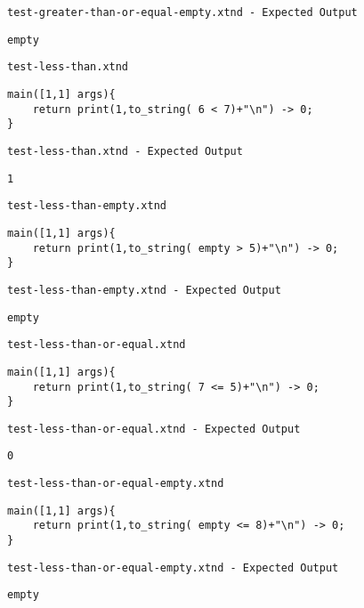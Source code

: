 \medskip \noindent \texttt{test-greater-than-or-equal-empty.xtnd - Expected Output}


\begin{lstlisting}
empty
\end{lstlisting}


\medskip \noindent \texttt{test-less-than.xtnd}


\begin{lstlisting}
main([1,1] args){
	return print(1,to_string( 6 < 7)+"\n") -> 0;
}
\end{lstlisting}


\medskip \noindent \texttt{test-less-than.xtnd - Expected Output}


\begin{lstlisting}
1
\end{lstlisting}


\medskip \noindent \texttt{test-less-than-empty.xtnd}


\begin{lstlisting}
main([1,1] args){
	return print(1,to_string( empty > 5)+"\n") -> 0;
}
\end{lstlisting}


\medskip \noindent \texttt{test-less-than-empty.xtnd - Expected Output}


\begin{lstlisting}
empty
\end{lstlisting}


\medskip \noindent \texttt{test-less-than-or-equal.xtnd}


\begin{lstlisting}
main([1,1] args){
	return print(1,to_string( 7 <= 5)+"\n") -> 0;
}
\end{lstlisting}


\medskip \noindent \texttt{test-less-than-or-equal.xtnd - Expected Output}


\begin{lstlisting}
0
\end{lstlisting}


\medskip \noindent \texttt{test-less-than-or-equal-empty.xtnd}


\begin{lstlisting}
main([1,1] args){
	return print(1,to_string( empty <= 8)+"\n") -> 0;
}
\end{lstlisting}


\medskip \noindent \texttt{test-less-than-or-equal-empty.xtnd - Expected Output}


\begin{lstlisting}
empty
\end{lstlisting}


